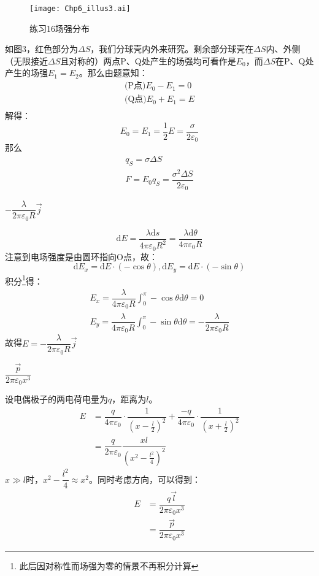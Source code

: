 \documentclass[b5paper,opensource,sourcefont,parskip]{qyxf-book}
\newcommand{\di}[1]{\mathrm{d}#1}
\begin{document}
\begin{figure}[!htbp]
	\centering
	\texttt{[image: Chp6\_illus3.ai]}
	\caption{练习16\quad 场强分布}
\end{figure}
如图3，红色部分为$\Delta S$，我们分球壳内外来研究。剩余部分球壳在$\Delta S$内、外侧（无限接近$\Delta S$且对称的）两点P、Q处产生的场强均可看作是$E_0$，而$\Delta S$在P、Q处产生的场强$E_1=E_2$。那么由题意知：
\begin{gather*}
	\text{(P点)}E_0-E_1=0\\
	\text{(Q点)}E_0+E_1=E\\
\end{gather*}
解得：
\[
E_0=E_1=\dfrac{1}{2}E=\dfrac{\sigma}{2\varepsilon_0}
\]
那么
\begin{gather*}
	q_S=\sigma\Delta S\\
	F=E_0q_S=\dfrac{\sigma^2\Delta S}{2\varepsilon_0}
\end{gather*}

$-\dfrac{\lambda}{2\pi\varepsilon_0R}\vec{j}$

\solve
\[
\di{E}=\dfrac{\lambda \di{s}}{4\pi \varepsilon_0 R^2}=\dfrac{\lambda \di{\theta}}{4\pi \varepsilon_0 R}
\]
注意到电场强度是由圆环指向O点，故：
\[
\di{E_x}=\di{E}\cdot (-\cos\theta),\di{E_y}=\di{E}\cdot (-\sin\theta)
\]
积分\footnote{此后因对称性而场强为零的情景不再积分计算}得：
\begin{gather*}
	E_x=\dfrac{\lambda}{4\pi \varepsilon_0 R}\int_0^{\pi} -\cos\theta\di{\theta}=0\\
	E_y=\dfrac{\lambda}{4\pi \varepsilon_0 R}\int_0^{\pi} -\sin\theta\di{\theta}=-\dfrac{\lambda}{2\pi\varepsilon_0R}
\end{gather*}
故得$E=-\dfrac{\lambda}{2\pi\varepsilon_0R}\vec{j}$

$\dfrac{\vec{p}}{2\pi\varepsilon_0x^3}$

\solve
设电偶极子的两电荷电量为$q$，距离为$l$。
\begin{align*}
	E&=\dfrac{q}{4\pi\varepsilon_0}\cdot \dfrac{1}{(x-\frac{l}{2})^2}+\dfrac{-q}{4\pi\varepsilon_0}\cdot \dfrac{1}{(x+\frac{l}{2})^2}\\
	&=\dfrac{q}{2\pi\varepsilon_0}\dfrac{xl}{{(x^2-\frac{l^2}{4})}^2}
\end{align*}
$x\gg l$时，$x^2-\dfrac{l^2}{4}\approx x^2$。同时考虑方向，可以得到：
\begin{align*}
	E&=\dfrac{q\vec{l}}{2\pi\varepsilon_0x^3}\\
	&=\dfrac{\vec{p}}{2\pi\varepsilon_0x^3}
\end{align*}
\end{document}
